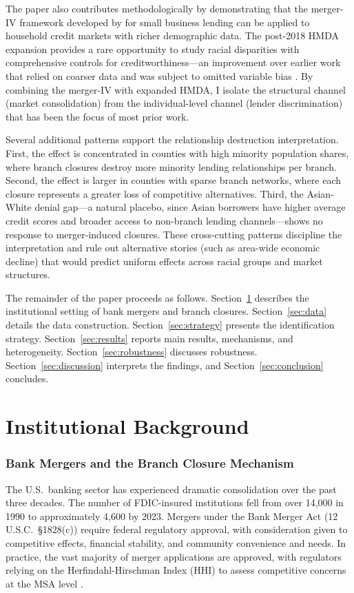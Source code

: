 \documentclass[12pt]{article}
\begin{document}
The paper also contributes methodologically by demonstrating that the merger-IV framework developed by \citet{nguyen2019} for small business lending can be applied to household credit markets with richer demographic data. The post-2018 HMDA expansion provides a rare opportunity to study racial disparities with comprehensive controls for creditworthiness---an improvement over earlier work that relied on coarser data and was subject to omitted variable bias \citep{munnell1996}. By combining the merger-IV with expanded HMDA, I isolate the structural channel (market consolidation) from the individual-level channel (lender discrimination) that has been the focus of most prior work.

Several additional patterns support the relationship destruction interpretation. First, the effect is concentrated in counties with high minority population shares, where branch closures destroy more minority lending relationships per branch. Second, the effect is larger in counties with sparse branch networks, where each closure represents a greater loss of competitive alternatives. Third, the Asian-White denial gap---a natural placebo, since Asian borrowers have higher average credit scores and broader access to non-branch lending channels---shows no response to merger-induced closures. These cross-cutting patterns discipline the interpretation and rule out alternative stories (such as area-wide economic decline) that would predict uniform effects across racial groups and market structures.

The remainder of the paper proceeds as follows. Section~\ref{sec:background} describes the institutional setting of bank mergers and branch closures. Section~\ref{sec:data} details the data construction. Section~\ref{sec:strategy} presents the identification strategy. Section~\ref{sec:results} reports main results, mechanisms, and heterogeneity. Section~\ref{sec:robustness} discusses robustness. Section~\ref{sec:discussion} interprets the findings, and Section~\ref{sec:conclusion} concludes.


\section{Institutional Background}
\label{sec:background}

\subsubsection*{Bank Mergers and the Branch Closure Mechanism} The U.S.\ banking sector has experienced dramatic consolidation over the past three decades. The number of FDIC-insured institutions fell from over 14,000 in 1990 to approximately 4,600 by 2023. Mergers under the Bank Merger Act (12 U.S.C.\ \S1828(c)) require federal regulatory approval, with consideration given to competitive effects, financial stability, and community convenience and needs. In practice, the vast majority of merger applications are approved, with regulators relying on the Herfindahl-Hirschman Index (HHI) to assess competitive concerns at the MSA level \citep{focarelli2003}.
\end{document}
